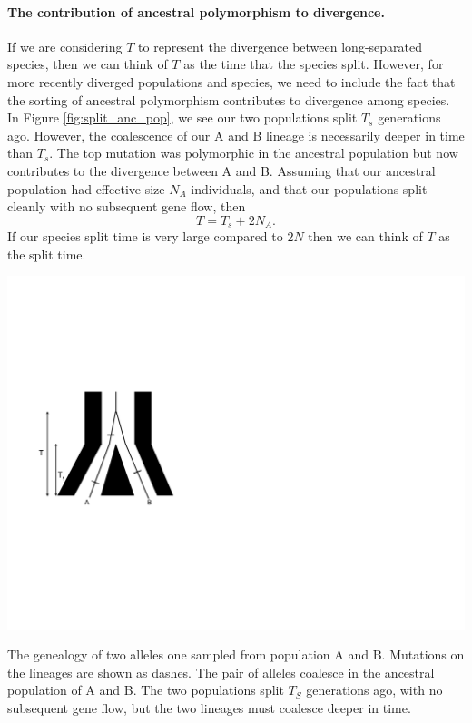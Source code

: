 \paragraph{The contribution of ancestral polymorphism to divergence.} If we are considering $T$ to represent the divergence between long-separated species, then we can think of $T$ as the time that the
species split. However, for more recently diverged populations and
species, we need to include the fact that the sorting of ancestral
polymorphism contributes to divergence among species. In Figure
\ref{fig:split_anc_pop}, we see our two populations split $T_s$ generations ago.  However, the
coalescence of our A and B lineage is necessarily deeper in time than
$T_s$. The top mutation was polymorphic in the ancestral population
but now contributes to the divergence between A and B. Assuming that
our ancestral population had effective size $N_A$ individuals, and
that our populations split cleanly with no subsequent gene flow, then
\begin{equation}
T = T_s + 2N_A.
\end{equation}
If our species split time is very large compared to $2N$ then we can think of $T$ as the split time.
\begin{marginfigure}
\begin{center}
\includegraphics[width=0.8 \textwidth]{figures/Genetic_drift/ILS/split_anc_pop.pdf}
\end{center}
\caption{The genealogy of two alleles one sampled from population A and B. Mutations on the lineages are shown as dashes. The pair of alleles coalesce in the ancestral population of A and B. The two populations split $T_S$ generations ago, with no subsequent gene flow, but the two lineages must coalesce deeper in time. } \label{fig:split_anc_pop}
\end{marginfigure}

